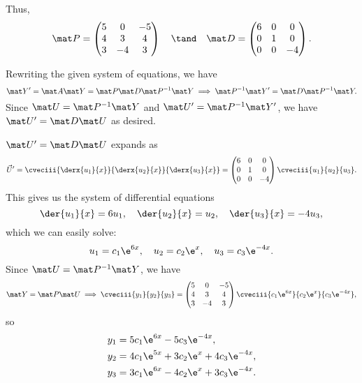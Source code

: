 \begin{solution}
\begin{ppart}
        Thus, \[\mat P = \begin{pmatrix}5 & 0 & -5 \\ 4 & 3 & 4 \\ 3 & -4 & 3\end{pmatrix} \quad \tand \quad \mat D = \begin{pmatrix}6 & 0 & 0 \\ 0 & 1 & 0 \\ 0 & 0 & -4\end{pmatrix}.\]
    \end{ppart}
    \begin{ppart}
        Rewriting the given system of equations, we have \[\mat Y' = \mat A \mat Y = \mat P \mat D \mat P^{-1} \mat Y \implies \mat P^{-1} \mat Y' = \mat D \mat P^{-1} \mat Y.\] Since $\mat U = \mat P^{-1} \mat Y$ and $\mat U' = \mat P^{-1} \mat Y'$, we have $\mat U' = \mat D \mat U$ as desired.
    \end{ppart}
    \begin{ppart}
        $\mat U' = \mat D \mat U$ expands as \[\vec U' = \cveciii{\derx{u_1}{x}}{\derx{u_2}{x}}{\derx{u_3}{x}} = \begin{pmatrix}6 & 0 & 0 \\ 0 & 1 & 0 \\ 0 & 0 & -4\end{pmatrix} \cveciii{u_1}{u_2}{u_3}.\] This gives us the system of differential equations \[\der{u_1}{x} = 6 u_1, \quad \der{u_2}{x} = u_2, \quad \der{u_3}{x} = -4 u_3,\] which we can easily solve: \[u_1 = c_1 \e^{6x}, \quad u_2 = c_2 \e^{x}, \quad u_3 = c_3 \e^{-4x}.\] Since $\mat U = \mat P^{-1} \mat Y$, we have \[\mat Y = \mat P \mat U \implies \cveciii{y_1}{y_2}{y_3} = \begin{pmatrix}5 & 0 & -5 \\ 4 & 3 & 4 \\ 3 & -4 & 3\end{pmatrix} \cveciii{c_1 \e^{6x}}{c_2 \e^{x}}{c_3 \e^{-4x}},\] so
        \begin{align*}
            y_1 &= 5c_1 \e^{6x} - 5c_3 \e^{-4x},\\
            y_2 &= 4c_1 \e^{5x} + 3c_2 \e^{x} + 4c_3 \e^{-4x},\\
            y_3 &= 3c_1 \e^{6x} - 4c_2 \e^{x} + 3c_3 \e^{-4x}.
        \end{align*}
    \end{ppart}
\end{solution}


